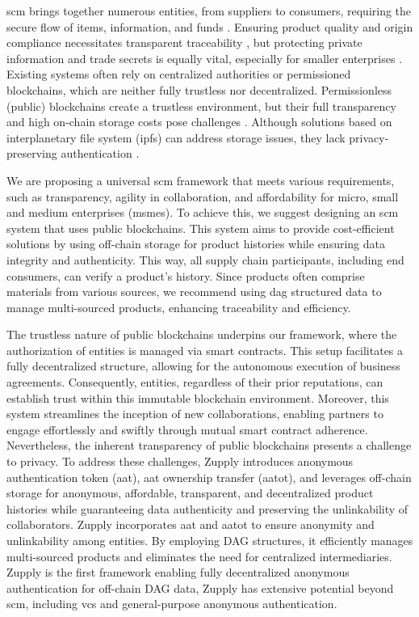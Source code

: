 \gls{scm} brings together numerous entities, from suppliers to consumers, requiring the secure flow of items, information, and funds \cite{wisner2021principles}. Ensuring product quality and origin compliance necessitates transparent traceability \cite{SUN2019658}, but protecting private information and trade secrets is equally vital, especially for smaller enterprises \cite{ Winter2023SMEs}. Existing systems often rely on centralized authorities or permissioned blockchains, which are neither fully trustless nor decentralized. Permissionless (public) blockchains create a trustless environment, but their full transparency and high on-chain storage costs pose challenges \cite{ Zhou2022EthereumGraph}. Although solutions based on 
interplanetary file system (\gls{ipfs}) \cite{ipfs} can address storage issues, they lack privacy-preserving authentication \cite{Khor2023, Musamih2021}. 

We are proposing a universal \gls{scm} framework that meets various requirements, such as transparency, agility in collaboration, and affordability for micro, small and medium enterprises (\gls{msme}s). To achieve this, we suggest designing an \gls{scm} system that uses public blockchains. This system aims to provide cost-efficient solutions by using off-chain storage for product histories while ensuring data integrity and authenticity. This way, all supply chain participants, including end consumers, can verify a product's history. Since products often comprise materials from various sources, we recommend using \gls{dag} structured data to manage multi-sourced products, enhancing traceability and efficiency. 

The trustless nature of public blockchains underpins our framework, where the authorization of entities is managed via smart contracts. This setup facilitates a fully decentralized structure, allowing for the autonomous execution of business agreements. Consequently, entities, regardless of their prior reputations, can establish trust within this immutable blockchain environment. Moreover, this system streamlines the inception of new collaborations, enabling partners to engage effortlessly and swiftly through mutual smart contract adherence. Nevertheless, the inherent transparency of public blockchains presents a challenge to privacy. 
To address these challenges, Zupply introduces anonymous authentication token (\gls{aat}), \gls{aat} ownership transfer (\gls{aatot}), and leverages off-chain storage for anonymous, affordable, transparent, and decentralized product histories while guaranteeing data authenticity and  preserving the unlinkability of collaborators. Zupply incorporates \gls{aat} and \gls{aatot} to ensure anonymity and unlinkability among entities. By employing DAG structures, it efficiently manages multi-sourced products and eliminates the need for centralized intermediaries. Zupply is the first framework enabling fully decentralized anonymous authentication for off-chain DAG data, Zupply has extensive potential beyond \gls{scm}, including \gls{vcs} and general-purpose anonymous authentication. 

